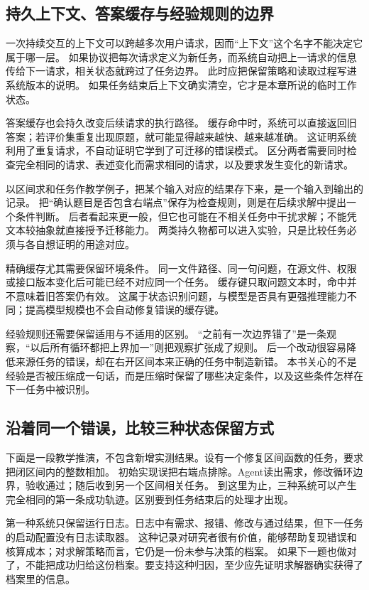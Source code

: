 \subsection{持久上下文、答案缓存与经验规则的边界}

一次持续交互的上下文可以跨越多次用户请求，因而``上下文''这个名字不能决定它属于哪一层。
如果协议把每次请求定义为新任务，而系统自动把上一请求的信息传给下一请求，相关状态就跨过了任务边界。
此时应把保留策略和读取过程写进系统版本的说明。
如果任务结束后上下文确实清空，它才是本章所说的临时工作状态。

答案缓存也会持久改变后续请求的执行路径。
缓存命中时，系统可以直接返回旧答案；若评价集重复出现原题，就可能显得越来越快、越来越准确。
这证明系统利用了重复请求，不自动证明它学到了可迁移的错误模式。
区分两者需要同时检查完全相同的请求、表述变化而需求相同的请求，以及要求发生变化的新请求。

以区间求和任务作教学例子，把某个输入对应的结果存下来，是一个输入到输出的记录。
把``确认题目是否包含右端点''保存为检查规则，则是在后续求解中提出一个条件判断。
后者看起来更一般，但它也可能在不相关任务中干扰求解；不能凭文本较抽象就直接授予迁移能力。
两类持久物都可以进入实验，只是比较任务必须与各自想证明的用途对应。

精确缓存尤其需要保留环境条件。
同一文件路径、同一句问题，在源文件、权限或接口版本变化后可能已经不对应同一个任务。
缓存键只取问题文本时，命中并不意味着旧答案仍有效。
这属于状态识别问题，与模型是否具有更强推理能力不同；提高模型规模也不会自动修复错误的缓存键。

经验规则还需要保留适用与不适用的区别。
``之前有一次边界错了''是一条观察，``以后所有循环都把上界加一''则把观察扩张成了规则。
后一个改动很容易降低来源任务的错误，却在右开区间本来正确的任务中制造新错。
本书关心的不是经验是否被压缩成一句话，而是压缩时保留了哪些决定条件，以及这些条件怎样在下一任务中被识别。

\subsection{沿着同一个错误，比较三种状态保留方式}

下面是一段教学推演，不包含新增实测结果。设有一个修复区间函数的任务，要求把闭区间内的整数相加。
初始实现误把右端点排除。Agent读出需求，修改循环边界，验收通过；随后收到另一个区间相关任务。
到这里为止，三种系统可以产生完全相同的第一条成功轨迹。区别要到任务结束后的处理才出现。

第一种系统只保留运行日志。日志中有需求、报错、修改与通过结果，但下一任务的启动配置没有日志读取器。
这种记录对研究者很有价值，能够帮助复现错误和核算成本；对求解策略而言，它仍是一份未参与决策的档案。
如果下一题也做对了，不能把成功归给这份档案。要支持这种归因，至少应先证明求解器确实获得了档案里的信息。

